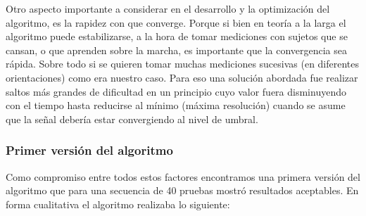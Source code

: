 \documentclass{article}
\begin{document}
    Otro aspecto importante a considerar en el desarrollo y la optimización del algoritmo, es la rapidez con que converge. Porque si bien en teoría a la larga el algoritmo puede estabilizarse, a la hora de tomar mediciones con sujetos que se cansan, o que aprenden sobre la marcha, es importante que la convergencia sea rápida. Sobre todo si se quieren tomar muchas mediciones sucesivas (en diferentes orientaciones) como era nuestro caso. Para eso una solución abordada fue realizar saltos más grandes de dificultad en un principio cuyo valor fuera disminuyendo con el tiempo hasta reducirse al mínimo (máxima resolución) cuando se asume que la señal debería estar convergiendo al nivel de umbral. 
    
    \subsubsection{Primer versión del algoritmo} \label{staircase1}
    
    Como compromiso entre todos estos factores encontramos una primera versión del algoritmo que para una secuencia de 40 pruebas mostró resultados aceptables. En forma cualitativa el algoritmo realizaba lo siguiente:
    
\end{document}
